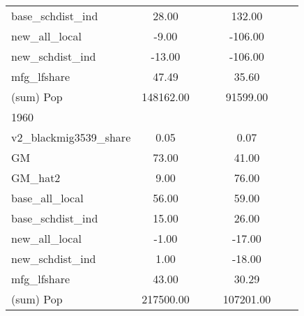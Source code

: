 \begin{table}[htbp]
\begin{tabular}{l*{2}{ccc}}
base\_schdist\_ind    &       28.00&            &            &      132.00&            &            \\
new\_all\_local       &       -9.00&            &            &     -106.00&            &            \\
new\_schdist\_ind     &      -13.00&            &            &     -106.00&            &            \\
mfg\_lfshare         &       47.49&            &            &       35.60&            &            \\
(sum) Pop           &   148162.00&            &            &    91599.00&            &            \\
\midrule
1960                &            &            &            &            &            &            \\
v2\_blackmig3539\_share&        0.05&            &            &        0.07&            &            \\
GM                  &       73.00&            &            &       41.00&            &            \\
GM\_hat2             &        9.00&            &            &       76.00&            &            \\
base\_all\_local      &       56.00&            &            &       59.00&            &            \\
base\_schdist\_ind    &       15.00&            &            &       26.00&            &            \\
new\_all\_local       &       -1.00&            &            &      -17.00&            &            \\
new\_schdist\_ind     &        1.00&            &            &      -18.00&            &            \\
mfg\_lfshare         &       43.00&            &            &       30.29&            &            \\
(sum) Pop           &   217500.00&            &            &   107201.00&            &            \\
\bottomrule
\end{tabular}
\end{table}
